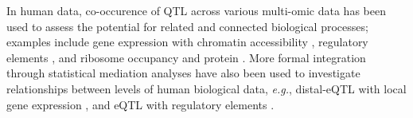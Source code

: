 \documentclass[9pt,twocolumn,twoside]{gsajnl}
\newcommand{\eg}{\emph{e.g.}\xspace}
\begin{document}
In human data, co-occurence of QTL across various multi-omic data has been used to assess the potential for related and connected biological processes; examples include gene expression with chromatin accessibility \citep{Degner2012}, regulatory elements \citep{Pai2015},  and ribosome occupancy and protein \citep{Battle2015, Yang2017}.
More formal integration through statistical mediation analyses have also been used to investigate relationships between levels of human biological data, \eg, distal-eQTL with local gene expression \citep{Battle2014}, and eQTL with regulatory elements \citep{Alasoo2017, Roytman2018, Wu2018}.
\end{document}
